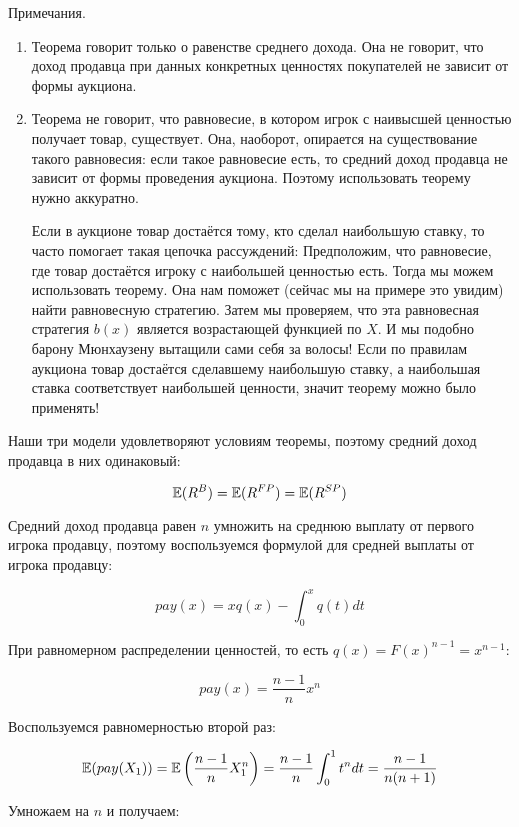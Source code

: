 Примечания.
\begin{enumerate}
\item Теорема говорит только о равенстве среднего дохода. Она не говорит, что доход продавца при данных конкретных ценностях покупателей не зависит от формы аукциона.
\item Теорема не говорит, что равновесие, в котором игрок с наивысшей ценностью получает товар, существует. Она, наоборот, опирается на существование такого равновесия: если такое равновесие есть, то средний доход продавца не зависит от формы проведения аукциона. Поэтому использовать теорему нужно аккуратно.

Если в аукционе товар достаётся тому, кто сделал наибольшую ставку, то часто помогает такая цепочка рассуждений: Предположим, что равновесие, где товар достаётся игроку с наибольшей ценностью есть. Тогда мы можем использовать теорему. Она нам поможет (сейчас мы на примере это увидим) найти равновесную стратегию. Затем мы проверяем, что эта равновесная стратегия $ b(x) $ является возрастающей функцией по $ X $. И мы подобно барону Мюнхаузену вытащили сами себя за волосы! Если по правилам аукциона товар достаётся сделавшему наибольшую ставку, а наибольшая ставка соответствует наибольшей ценности, значит теорему можно было применять!
\end{enumerate}


Наши три модели удовлетворяют условиям теоремы, поэтому средний доход продавца в них одинаковый:

\[ \mathbb{E}(R^{B})=\mathbb{E}(R^{FP})=\mathbb{E}(R^{SP}) \]

Средний доход продавца равен $ n $ умножить на среднюю выплату от первого игрока продавцу, поэтому воспользуемся формулой для средней выплаты от игрока продавцу:

\[ pay(x)=xq(x)-\int_{0}^{x}q(t)dt \]

При равномерном распределении ценностей, то есть $ q(x)=F(x)^{n-1}=x^{n-1} $:

\begin{equation}
pay(x)=\frac{n-1}{n}x^{n}
\end{equation}

Воспользуемся равномерностью второй раз:

\begin{equation}
\mathbb{E}(pay(X_{1}))=\mathbb{E}\left(\frac{n-1}{n}X_{1}^{n}\right)=\frac{n-1}{n}\int_{0}^{1} t^{n} dt=\frac{n-1}{n(n+1)}
\end{equation}

Умножаем на $ n $ и получаем:

